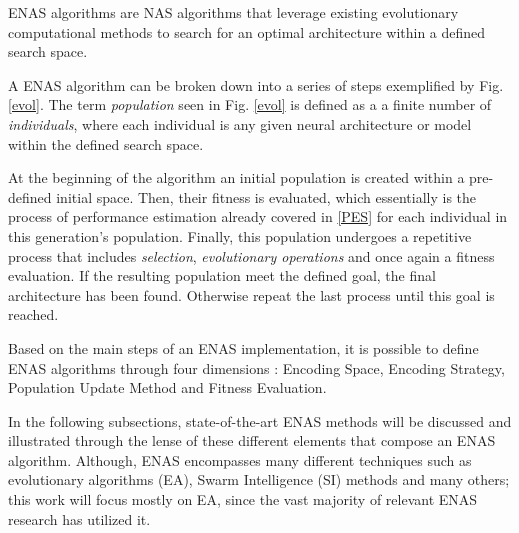 \documentclass[10pt,        %
               a4paper,     %
               journal,     %
               ]{IEEEtran}
\begin{document}
ENAS algorithms are NAS algorithms that leverage existing evolutionary computational methods
to search for an optimal architecture within a defined search space.

A ENAS algorithm can be broken down into a series of steps exemplified by Fig. \ref{evol}. The term \textit{population} seen
in Fig. \ref{evol} is defined as a
a finite number of \textit{individuals}, where each individual is any given neural architecture or model within the defined  search space.

At the beginning of the algorithm an initial population is created within a pre-defined initial space.
Then, their fitness is evaluated, which essentially is the process of performance estimation already covered in \ref{PES}
for each individual in this generation's population. Finally, this population undergoes a repetitive process that
includes \textit{selection}, \textit{evolutionary operations} and once again a fitness evaluation. If the resulting
population meet the defined goal, the final architecture has been found. Otherwise repeat the last process until this
goal is reached.

Based on the main steps of an ENAS implementation, it is possible to define ENAS algorithms
through four dimensions \cite{liu2021survey}: Encoding Space, Encoding Strategy, Population Update Method and
Fitness Evaluation.

%
%
%

In the following subsections, state-of-the-art ENAS methods will be discussed and illustrated through
the lense of these different elements that compose an ENAS algorithm. Although, ENAS encompasses many different
techniques such as evolutionary algorithms (EA), Swarm Intelligence (SI) methods and many others;
this work will focus mostly on EA, since the vast majority of relevant ENAS research has utilized it.
\end{document}
